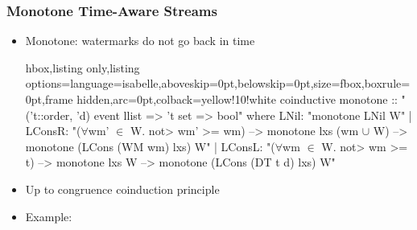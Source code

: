 \documentclass[aspectratio=169,10pt]{beamer}
\begin{document}
\begin{frame}[fragile]
  \frametitle{Monotone Time-Aware Streams}
  \begin{itemize}
    \item Monotone: watermarks do not go back in time
\vspace*{-1ex}
\begin{tcblisting}{hbox,listing only,listing options={language=isabelle,aboveskip=0pt,belowskip=0pt},size=fbox,boxrule=0pt,frame hidden,arc=0pt,colback=yellow!10!white}
coinductive monotone :: "('t::order, 'd) event llist => 't set => bool" where
  LNil: "monotone LNil W"
| LConsR: "($\forall$wm' $\in$ W. \<not> wm' >= wm) --> monotone lxs ({wm} $\cup$ W) -->
   monotone (LCons (WM wm) lxs) W"
| LConsL: "($\forall$wm $\in$ W. \<not> wm >= t) --> monotone lxs W -->
   monotone (LCons (DT t d) lxs) W"
\end{tcblisting}
\vspace*{-1ex}
          \item Up to congruence coinduction principle
    \item Example:
  \end{itemize}


\end{frame}
\end{document}
